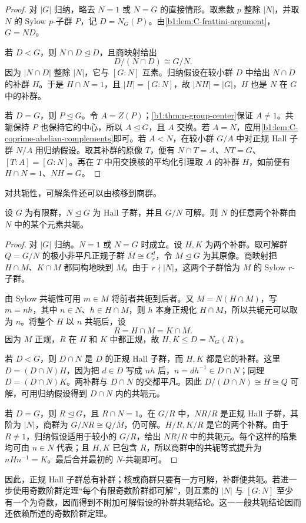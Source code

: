 \begin{proof}
	对 \(|G|\) 归纳，略去 \(N=1\) 或 \(N=G\) 的直接情形。取素数 \(p\) 整除 \(|N|\)，并取 \(N\) 的 Sylow \(p\)-子群 \(P\)，记 \(D=N_G(P)\)。由\cref{b1:lem:C-frattini-argument}，\(G=ND\)。

	若 \(D<G\)，则 \(N\cap D\trianglelefteq D\)，且商映射给出
	\[
		D/(N\cap D)\cong G/N.
	\]
	因为 \(|N\cap D|\) 整除 \(|N|\)，它与 \([G:N]\) 互素。归纳假设在较小群 \(D\) 中给出 \(N\cap D\) 的补群 \(H\)。于是 \(H\cap N=1\)，且 \(|H|=[G:N]\)，故 \(|NH|=|G|\)，\(H\) 也是 \(N\) 在 \(G\) 中的补群。

	若 \(D=G\)，则 \(P\trianglelefteq G\)。令 \(A=Z(P)\)；\cref{b1:thm:p-group-center}保证 \(A\ne1\)。共轭保持 \(P\) 也保持它的中心，所以 \(A\trianglelefteq G\)，且 \(A\) 交换。若 \(A=N\)，应用\cref{b1:lem:C-coprime-abelian-complements}即可。若 \(A<N\)，在较小群 \(G/A\) 中对正规 Hall 子群 \(N/A\) 用归纳假设。取其补群的原像 \(T\)，便有 \(N\cap T=A\)、\(NT=G\)、\([T:A]=[G:N]\)。再在 \(T\) 中用交换核的平均化引理取 \(A\) 的补群 \(H\)，如前便有 \(H\cap N=1\)、\(NH=G\)。
\end{proof}

对共轭性，可解条件还可以由核移到商群。

\begin{proposition}\label{b1:prop:C-complements-solvable-quotient}
	设 \(G\) 为有限群，\(N\trianglelefteq G\) 为 Hall 子群，并且 \(G/N\) 可解。则 \(N\) 的任意两个补群由 \(N\) 中的某个元素共轭。
\end{proposition}

\begin{proof}
	对 \(|G|\) 归纳。\(N=1\) 或 \(N=G\) 时成立。设 \(H,K\) 为两个补群。取可解群 \(Q=G/N\) 的极小非平凡正规子群 \(\overline M\cong C_r^d\)，令 \(M\trianglelefteq G\) 为其原像。商映射把 \(H\cap M\)、\(K\cap M\) 都同构地映到 \(\overline M\)。由于 \(r\nmid|N|\)，这两个子群恰为 \(M\) 的 Sylow \(r\)-子群。

	由 Sylow 共轭性可用 \(m\in M\) 将前者共轭到后者。又 \(M=N(H\cap M)\)，写 \(m=nh\)，其中 \(n\in N\)、\(h\in H\cap M\)，则 \(h\) 本身正规化 \(H\cap M\)，所以共轭元可以取为 \(n\)。将整个 \(H\) 以 \(n\) 共轭后，设
	\[
		R=H\cap M=K\cap M.
	\]
	因为 \(M\) 正规，\(R\) 在 \(H\) 和 \(K\) 中都正规，故 \(H,K\leq D=N_G(R)\)。

	若 \(D<G\)，则 \(D\cap N\) 是 \(D\) 的正规 Hall 子群，而 \(H,K\) 都是它的补群。这里 \(D=(D\cap N)H\)，因为把 \(d\in D\) 写成 \(nh\) 后，\(n=dh^{-1}\in D\cap N\)；同理 \(D=(D\cap N)K\)。两补群与 \(D\cap N\) 的交都平凡。因此 \(D/(D\cap N)\cong H\cong Q\) 可解，可用归纳假设得到 \(D\cap N\) 内的共轭元。

	若 \(D=G\)，则 \(R\trianglelefteq G\)，且 \(R\cap N=1\)。在 \(G/R\) 中，\(NR/R\) 是正规 Hall 子群，其阶为 \(|N|\)，商群为 \(G/NR\cong Q/\overline M\)，仍可解。\(H/R,K/R\) 是它的两个补群。由于 \(R\ne1\)，归纳假设适用于较小的 \(G/R\)，给出 \(NR/R\) 中的共轭元。每个这样的陪集均可由 \(n\in N\) 代表；且 \(H,K\) 已包含 \(R\)，所以商群中的共轭等式提升为 \(nHn^{-1}=K\)。最后合并最初的 \(N\)-共轭即可。
\end{proof}

因此，正规 Hall 子群总有补群；核或商群只要有一方可解，补群便共轭。若进一步使用奇数阶群定理“每个有限奇数阶群都可解”，则互素的 \(|N|\) 与 \([G:N]\) 至少有一个为奇数，因而得到不附加可解假设的补群共轭结论。这一一般共轭结论因而还依赖所述的奇数阶群定理。
